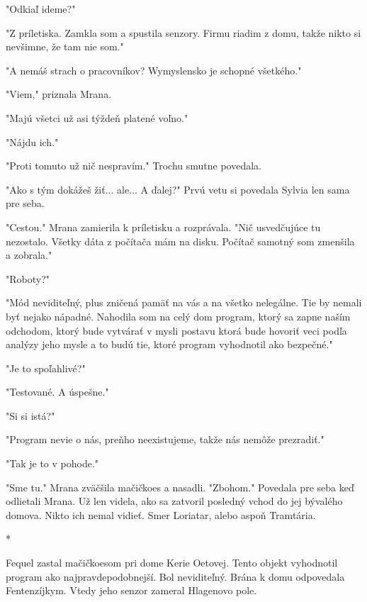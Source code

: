 \documentclass{book}
\begin{document}
"$ $Odkiaľ ideme?"$ $ 

"$ $Z príletiska. Zamkla som a spustila senzory. Firmu riadim z domu, takže nikto si nevšimne, že tam nie som."$ $ 

"$ $A nemáš strach o pracovníkov? Wymyslensko je schopné všetkého."$ $ 

"$ $Viem,"$ $  priznala Mrana.

"$ $Majú všetci už asi týždeň platené voľno."$ $ 

"$ $Nájdu ich."$ $ 

"$ $Proti tomuto už nič nespravím."$ $  Trochu smutne povedala.

"$ $Ako s tým dokážeš žiť... ale... A ďalej?"$ $  Prvú vetu si povedala Sylvia len sama pre seba.

"$ $Cestou."$ $  Mrana zamierila k príletisku a rozprávala. "$ $Nič usvedčujúce tu nezostalo. Všetky dáta z počítača mám na disku. Počítač samotný som zmenšila a zobrala."$ $ 

"$ $Roboty?"$ $ 

"$ $Mód neviditeľný, plus zničená pamäť na vás a na všetko nelegálne. Tie by nemali byť nejako nápadné. Nahodila som na celý dom program, ktorý sa zapne naším odchodom, ktorý bude vytvárať v mysli postavu ktorá bude hovoriť veci podľa analýzy jeho mysle a to budú tie, ktoré program vyhodnotil ako bezpečné."$ $ 

"$ $Je to spoľahlivé?"$ $ 

"$ $Testované. A úspešne."$ $ 

"$ $Si si istá?"$ $ 

"$ $Program nevie o nás, preňho neexistujeme, takže nás nemôže prezradiť."$ $ 

"$ $Tak je to v pohode."$ $ 

"$ $Sme tu."$ $  Mrana zväčšila mačičkoes a nasadli. "$ $Zbohom."$ $  Povedala pre seba keď odlietali Mrana. Už len videla, ako sa zatvoril posledný vchod do jej bývalého domova. Nikto ich nemal vidieť. Smer Loriatar, alebo aspoň Tramtária.

\begin{center}

*

\end{center}

Fequel zastal mačičkoesom pri dome Kerie Oetovej. Tento objekt vyhodnotil program ako najpravdepodobnejší. Bol neviditeľný. Brána k domu odpovedala Fentenzíjkym. Vtedy jeho senzor zameral Hlagenovo pole.
\end{document}

